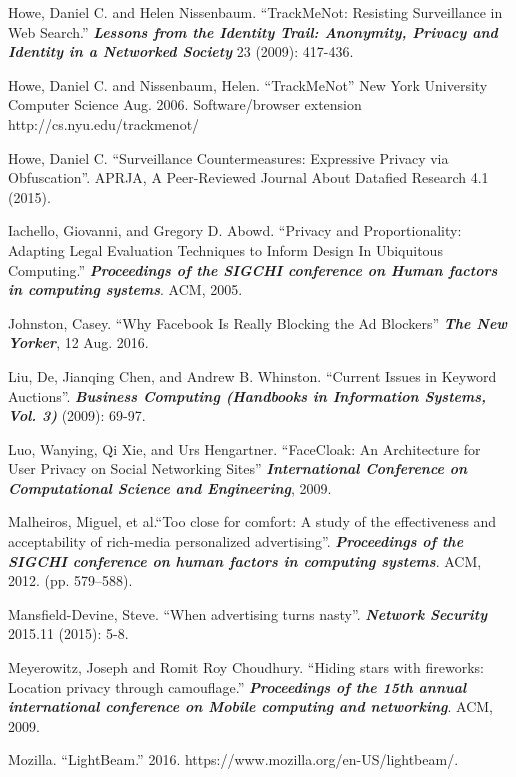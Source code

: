 \documentclass[conference]{IEEEtran}
\begin{document}
\begin{thebibliography}{99}
 Howe, Daniel C. and Helen Nissenbaum. “TrackMeNot: Resisting Surveillance in Web Search.” \textbf{\textit{Lessons from the Identity Trail: Anonymity, Privacy and Identity in a Networked Society}} 23 (2009): 417-436.

 Howe, Daniel C. and Nissenbaum, Helen. “TrackMeNot” New York University Computer Science Aug. 2006. Software/browser extension http://cs.nyu.edu/trackmenot/

 Howe, Daniel C. “Surveillance Countermeasures: Expressive Privacy via Obfuscation”. APRJA, A Peer-Reviewed Journal About Datafied Research 4.1 (2015).

 Iachello, Giovanni, and Gregory D. Abowd. “Privacy and Proportionality: Adapting Legal Evaluation Techniques to Inform Design In Ubiquitous Computing.” \textbf{\textit{Proceedings of the SIGCHI conference on Human factors in computing systems}}. ACM, 2005.

 Johnston, Casey. “Why Facebook Is Really Blocking the Ad Blockers” \textbf{\textit{The New Yorker}}, 12 Aug. 2016.

 Liu, De, Jianqing Chen, and Andrew B. Whinston. “Current Issues in Keyword Auctions”. \textbf{\textit{Business Computing (Handbooks in Information Systems, Vol. 3)}} (2009): 69-97.

 Luo, Wanying, Qi Xie, and Urs Hengartner. “FaceCloak: An Architecture for User Privacy on Social Networking Sites” \textbf{\textit{International Conference on Computational Science and Engineering}}, 2009.

 Malheiros, Miguel, et al.“Too close for comfort: A study of the effectiveness and acceptability of rich-media personalized advertising”. \textbf{\textit{Proceedings of the SIGCHI conference on human factors in computing systems}}. ACM, 2012. (pp. 579–588).

 Mansfield-Devine, Steve. “When advertising turns nasty”. \textbf{\textit{Network Security}} 2015.11 (2015): 5-8.

 Meyerowitz, Joseph and Romit Roy Choudhury. “Hiding stars with fireworks: Location privacy through camouflage.” \textbf{\textit{Proceedings of the 15th annual international conference on Mobile computing and networking}}. ACM, 2009.

 Mozilla. “LightBeam.” 2016. https://www.mozilla.org/en-US/lightbeam/.


\end{thebibliography}
\end{document}
